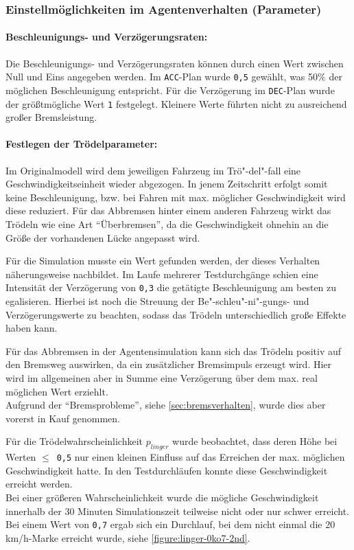 \subsubsection{Einstellmöglichkeiten im Agentenverhalten (Parameter)}

\paragraph*{Beschleunigungs- und Verzögerungsraten:}
\label{sec:acc-dec-rate}
Die Beschleunigungs- und Verzögerungsraten können durch einen Wert zwischen Null und Eins angegeben werden.
Im \texttt{ACC}-Plan wurde \texttt{0,5} gewählt, was \mbox{50$\%$} der möglichen Beschleunigung entspricht.
Für die Verzögerung im \texttt{DEC}-Plan wurde der größtmögliche Wert \texttt{1} festgelegt. 
Kleinere Werte führten nicht zu ausreichend großer Bremsleistung.


\paragraph*{Festlegen der Trödelparameter:}
\label{sec:lingersweetspot}
Im Originalmodell wird dem jeweiligen Fahrzeug im Trö"-del"-fall eine Geschwindigkeitseinheit wieder abgezogen. 
In jenem Zeitschritt erfolgt somit keine Beschleunigung, bzw. bei Fahren mit max. möglicher Geschwindigkeit wird diese reduziert. 
Für das Abbremsen hinter einem anderen Fahrzeug wirkt das Trödeln wie eine Art \enquote{Überbremsen}, da die Geschwindigkeit ohnehin an die Größe der vorhandenen Lücke angepasst wird.

Für die Simulation musste ein Wert gefunden werden, der dieses Verhalten näherungsweise nachbildet.
Im Laufe mehrerer Testdurchgänge schien eine Intensität der Verzögerung von \texttt{0,3} die getätigte Beschleunigung am besten zu egalisieren. 
Hierbei ist noch die Streuung der Be"-schleu"-ni"-gungs- und Verzögerungswerte zu beachten, sodass das Trödeln unterschiedlich große Effekte haben kann.

Für das Abbremsen in der Agentensimulation kann sich das Trödeln positiv auf den Bremsweg auswirken, da ein zusätzlicher Bremsimpuls erzeugt wird. 
Hier wird im allgemeinen aber in Summe eine Verzögerung über dem max. real möglichen Wert erziehlt.
\\
Aufgrund der \enquote{Bremsprobleme}, siehe \cref{sec:bremsverhalten}, wurde dies aber vorerst in Kauf genommen.

Für die Trödelwahrscheinlichkeit $ p_{linger} $ wurde beobachtet, dass deren Höhe bei Werten \mbox{$\leq$ \texttt{0,5}} nur einen kleinen Einfluss auf das Erreichen der max. möglichen Geschwindigkeit hatte.
In den Testdurchläufen konnte diese Geschwindigkeit erreicht werden.
\\
Bei einer größeren Wahrscheinlichkeit wurde die mögliche Geschwindigkeit innerhalb der 30 Minuten Simulationszeit teilweise nicht oder nur schwer erreicht.
Bei einem Wert von \texttt{0,7} ergab sich ein Durchlauf, bei dem nicht einmal die 20 km/h-Marke erreicht wurde, siehe \cref{figure:linger-0ko7-2nd}.

